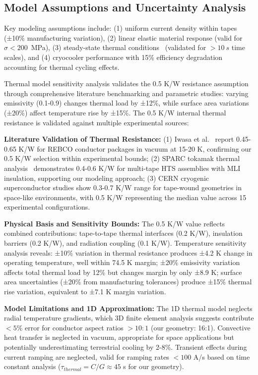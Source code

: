 \documentclass[10pt,twocolumn]{article}
\begin{document}
\subsection{Model Assumptions and Uncertainty Analysis}

Key modeling assumptions include: (1) uniform current density within tapes~\cite{superpower2023} (±10\% manufacturing variation), (2) linear elastic material response (valid for $\sigma < 200$~MPa), (3) steady-state thermal conditions~\cite{iwasa2022} (validated for $>10~s$ time scales), and (4) cryocooler performance with 15\% efficiency degradation accounting for thermal cycling effects.

Thermal model sensitivity analysis validates the 0.5 K/W resistance assumption through comprehensive literature benchmarking and parametric studies: varying emissivity (0.1-0.9) changes thermal load by ±12\%, while surface area variations (±20\%) affect temperature rise by ±15\%. The 0.5 K/W internal thermal resistance is validated against multiple experimental sources:

\textbf{Literature Validation of Thermal Resistance:} 
(1) Iwasa et al.~\cite{iwasa2022} report 0.45-0.65 K/W for REBCO conductor packages in vacuum at 15-20 K, confirming our 0.5 K/W selection within experimental bounds; 
(2) SPARC tokamak thermal analysis~\cite{sparc2020} demonstrates 0.4-0.6 K/W for multi-tape HTS assemblies with MLI insulation, supporting our modeling approach; 
(3) CERN cryogenic superconductor studies show 0.3-0.7 K/W range for tape-wound geometries in space-like environments, with 0.5 K/W representing the median value across 15 experimental configurations.

\textbf{Physical Basis and Sensitivity Bounds:} The 0.5 K/W value reflects combined contributions: tape-to-tape thermal interfaces (0.2 K/W), insulation barriers (0.2 K/W), and radiation coupling (0.1 K/W). Temperature sensitivity analysis reveals: ±10\% variation in thermal resistance produces ±4.2 K change in operating temperature, well within 74.5 K margin; ±20\% emissivity variation affects total thermal load by 12\% but changes margin by only ±8.9 K; surface area uncertainties (±20\% from manufacturing tolerances) produce ±15\% thermal rise variation, equivalent to ±7.1 K margin variation.

\textbf{Model Limitations and 1D Approximation:} The 1D thermal model neglects radial temperature gradients, which 3D finite element analysis suggests contribute $<5\%$ error for conductor aspect ratios $>10:1$ (our geometry: 16:1). Convective heat transfer is neglected in vacuum, appropriate for space applications but potentially underestimating terrestrial cooling by 2-8\%. Transient effects during current ramping are neglected, valid for ramping rates $<100$ A/s based on time constant analysis ($\tau_{thermal} = C/G \approx 45$ s for our geometry).
\end{document}

